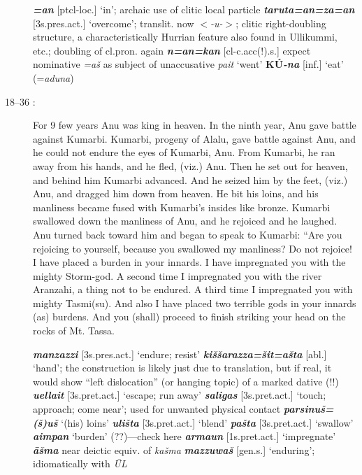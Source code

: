 \documentclass[10pt]{article}
\newcommand{\bit}[1]{\textbf{\textit{#1}}}				%
\newcommand{\p}[1]{{\tiny[{#1}]}}					%
\newcommand{\hith}{\textsubwedge{h}}
\renewcommand{\.}[1]{\textsubdot{#1}}
\begin{document}
\begin{description}
\begin{notes}

\bit{=an} \p{ptcl-loc.} `in'; archaic use of clitic local particle \bit{taru{\hith}ta=an=za=an} \p{3s.pres.act.} `overcome'; translit. now $<$\textit{-u{\hith}-}$>$; clitic right-doubling structure, a characteristically Hurrian feature also found in Ullikummi, etc.; doubling of cl.pron. again \bit{n=an=kan} \p{cl-c.acc(!).s.} expect nominative \textit{=a\v{s}} as subject of unaccusative \textit{pait} `went' \textbf{K\'U}\bit{-na} \p{inf.} `eat' (=\textit{aduna})

\end{notes}

\item[18--36 :] For 9 few years Anu was king in heaven. In the ninth year, Anu gave battle against Kumarbi. Kumarbi, progeny of Alalu, gave battle against Anu, and he could not endure the eyes of Kumarbi,  Anu. From Kumarbi, he ran away from his hands, and he fled, (viz.) Anu. Then he set out for heaven, and behind him Kumarbi advanced. And he seized him by the feet, (viz.) Anu, and dragged him down from heaven. He bit his loins, and his manliness became fused with Kumarbi's insides like bronze. Kumarbi swallowed down the manliness of Anu, and he rejoiced and he laughed. Anu turned back toward him and began to speak to Kumarbi: ``Are you rejoicing to yourself, because you swallowed my manliness? Do not rejoice! I have placed a burden in your innards. I have impregnated you with the mighty Storm-god. A second time I impregnated you with the river Aranzahi, a thing not to be endured. A third time I impregnated you with mighty Tasmi(su). And also I have placed two terrible gods in your innards (as) burdens. And you (shall) proceed to finish striking your head on the rocks of Mt. Tassa.  

\begin{notes}

\bit{manzazzi} \p{3s.pres.act.} `endure; resist' \bit{ki\v{s}\v{s}arazza=\v{s}it=a\v{s}ta} \p{abl.} `hand'; the construction is likely just due to translation, but if real, it would show ``left dislocation'' (or hanging topic) of a marked dative (!!) \bit{{\hith}uellait} \p{3s.pret.act.} `escape; run away' \bit{saligas} \p{3s.pret.act.} `touch; approach; come near'; used for unwanted physical contact \bit{parsinu\v{s}=(\v{s})u\v{s}} `(his) loins' \bit{uli\v{s}ta} \p{3s.pret.act.} `blend' \bit{pa\v{s}ta} \p{3s.pret.act.} `swallow' \bit{aimpan} `burden' (??)---check here \bit{arma{\hith}{\hith}un} \p{1s.pret.act.} `impregnate' \bit{\=a\v{s}ma} near deictic equiv. of \textit{ka\v{s}ma}  \bit{mazzuwa\v{s}} \p{gen.s.} `enduring'; idiomatically with \textit{\=UL}


\end{notes}
\end{description}
\end{document}
